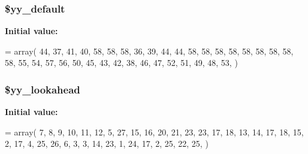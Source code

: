 \subsubsection[{\$yy\+\_\+default}]{\setlength{\rightskip}{0pt plus 5cm}\$yy\+\_\+default\hspace{0.3cm}{\ttfamily [static]}}\label{class_smarty___internal___configfileparser_a025f876f20f1828678cf388d553f79d1}
{\bfseries Initial value\+:}
\begin{DoxyCode}
= array(
     44,   37,   41,   40,   58,   58,   58,   36,   39,   44,
     44,   58,   58,   58,   58,   58,   58,   58,   58,   58,
     55,   54,   57,   56,   50,   45,   43,   42,   38,   46,
     47,   52,   51,   49,   48,   53,
)
\end{DoxyCode}
\hypertarget{class_smarty___internal___configfileparser_a3b8f838f9f7e95e02e4f0485fddc50f6}{}
\subsubsection[{\$yy\+\_\+lookahead}]{\setlength{\rightskip}{0pt plus 5cm}\$yy\+\_\+lookahead\hspace{0.3cm}{\ttfamily [static]}}\label{class_smarty___internal___configfileparser_a3b8f838f9f7e95e02e4f0485fddc50f6}
{\bfseries Initial value\+:}
\begin{DoxyCode}
= array(
      7,    8,    9,   10,   11,   12,    5,   27,   15,   16,
     20,   21,   23,   23,   17,   18,   13,   14,   17,   18,
     15,    2,   17,    4,   25,   26,    6,    3,    3,   14,
     23,    1,   24,   17,    2,   25,   22,   25,
)
\end{DoxyCode}
\hypertarget{class_smarty___internal___configfileparser_a3b856b0c76686b62efda7789aae55234}{}
